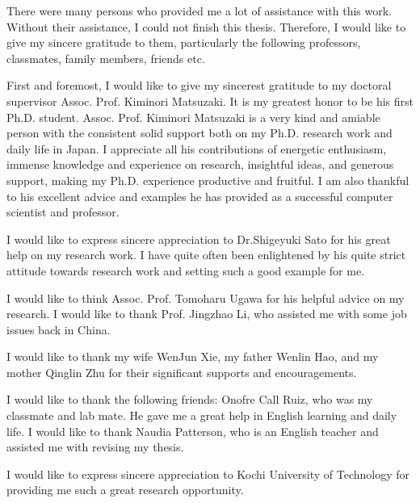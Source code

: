 \begin{acknowledgements}  


There were many persons who provided me a lot of assistance with this work. 
Without their assistance, I could not finish this thesis. Therefore, 
I would like to give my sincere
gratitude to them, particularly the following professors, classmates, family
members, friends etc.

First and foremost, I would like to give my sincerest gratitude to my doctoral
supervisor Assoc. Prof. Kiminori Matsuzaki. It is my greatest honor to be his
first Ph.D. student. Assoc. Prof. Kiminori Matsuzaki is a very kind and amiable
person with the consistent solid support both on my Ph.D. research work and
daily life in Japan. I appreciate all his contributions of energetic enthusiasm,
immense knowledge and experience on research, insightful ideas, and generous
support, making my Ph.D. experience productive and fruitful. I am also thankful
to his excellent advice and examples he has provided as a successful computer
scientist and professor.


I would like to express sincere appreciation to Dr.Shigeyuki Sato for his great
help on my research work. I have quite often been enlightened by his quite strict
attitude towards research work and setting such a good example for me.

I would like to think Assoc. Prof. Tomoharu Ugawa for his helpful advice 
on my research. I would like to thank Prof. Jingzhao Li, who assisted me 
with some job issues back in China. 

I would like to thank my wife WenJun Xie, my father Wenlin Hao, and my
mother Qinglin Zhu for their significant supports and encouragements.

I would like to thank the following friends: Onofre Call Ruiz, who was my 
classmate and lab mate. He gave me a great help in English learning and 
daily life. I would like to thank Naudia Patterson, who is an English 
teacher and assisted me with revising my thesis.

I would like to express sincere appreciation to Kochi University of Technology
for providing me such a great research opportunity.


\end{acknowledgements}

